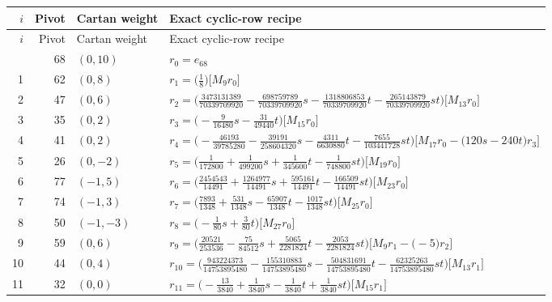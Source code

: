 \begingroup\footnotesize\setlength{\lineskip}{2pt}\setlength{\lineskiplimit}{2pt}
\setlength{\tabcolsep}{5pt}
\begin{longtable}{@{}rrlP{.64\linewidth}@{}}
\toprule
$i$ & Pivot & Cartan weight & Exact cyclic-row recipe\\
\midrule\endfirsthead
\toprule
$i$ & Pivot & Cartan weight & Exact cyclic-row recipe\\
\midrule\endhead
\bottomrule{} & 68 & $(0,10)$ & $r_{0}=e_{68}$\\
1 & 62 & $(0,8)$ & $r_{1}=\bigl(\frac{1}{8}\bigr)\bigl[M_{9}r_{0}\bigr]$\\
2 & 47 & $(0,6)$ & $r_{2}=\bigl(\frac{3473131389}{70339709920}-\frac{698759789}{70339709920}s-\frac{1318806853}{70339709920}t-\frac{265143879}{70339709920}st\bigr)\bigl[M_{13}r_{0}\bigr]$\\
3 & 35 & $(0,2)$ & $r_{3}=\bigl(-\frac{9}{16480}s-\frac{31}{49440}t\bigr)\bigl[M_{15}r_{0}\bigr]$\\
4 & 41 & $(0,2)$ & $r_{4}=\bigl(-\frac{46193}{39785280}-\frac{39191}{258604320}s-\frac{4311}{6630880}t-\frac{7655}{103441728}st\bigr)\bigl[M_{17}r_{0}-\allowbreak \bigl(120s-240t\bigr)r_{3}\bigr]$\\
5 & 26 & $(0,-2)$ & $r_{5}=\bigl(\frac{1}{172800}+\allowbreak \frac{1}{499200}s+\allowbreak \frac{1}{345600}t-\frac{1}{748800}st\bigr)\bigl[M_{19}r_{0}\bigr]$\\
6 & 77 & $(-1,5)$ & $r_{6}=\bigl(\frac{2454543}{14491}+\allowbreak \frac{1264977}{14491}s+\allowbreak \frac{595161}{14491}t-\frac{166509}{14491}st\bigr)\bigl[M_{23}r_{0}\bigr]$\\
7 & 74 & $(-1,3)$ & $r_{7}=\bigl(\frac{7893}{1348}+\allowbreak \frac{531}{1348}s-\frac{65907}{1348}t-\frac{1017}{1348}st\bigr)\bigl[M_{25}r_{0}\bigr]$\\
8 & 50 & $(-1,-3)$ & $r_{8}=\bigl(-\frac{1}{80}s+\allowbreak \frac{3}{80}t\bigr)\bigl[M_{27}r_{0}\bigr]$\\
9 & 59 & $(0,6)$ & $r_{9}=\bigl(\frac{20521}{253536}-\frac{75}{84512}s+\allowbreak \frac{5065}{2281824}t-\frac{2053}{2281824}st\bigr)\bigl[M_{9}r_{1}-\allowbreak \bigl(-5\bigr)r_{2}\bigr]$\\
10 & 44 & $(0,4)$ & $r_{10}=\bigl(\frac{943224373}{14753895480}-\frac{155310883}{14753895480}s-\frac{504831691}{14753895480}t-\frac{62325263}{14753895480}st\bigr)\bigl[M_{13}r_{1}\bigr]$\\
11 & 32 & $(0,0)$ & $r_{11}=\bigl(-\frac{13}{3840}+\allowbreak \frac{1}{3840}s-\frac{1}{3840}t+\allowbreak \frac{1}{3840}st\bigr)\bigl[M_{15}r_{1}\bigr]$\\

\end{longtable}
